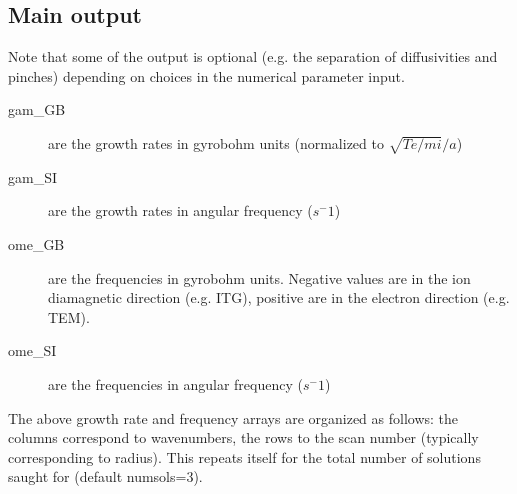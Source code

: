 \documentclass{article}
\begin{document}
\subsection{Main output}
Note that some of the output is optional (e.g. the separation of diffusivities and pinches) depending on choices in the numerical parameter input.
\begin{description} 
\item[gam\_GB] are the growth rates in gyrobohm units (normalized to $\sqrt{Te/mi}/a$)

\item[gam\_SI] are the growth rates in angular frequency ($s^-1$)

\item[ome\_GB] are the frequencies in gyrobohm units. Negative values are in the ion diamagnetic direction (e.g. ITG), positive are in the electron direction (e.g. TEM).

\item[ome\_SI] are the frequencies in angular frequency ($s^-1$)
\end{description} 

The above growth rate and frequency arrays are organized as follows: the columns correspond to wavenumbers, the rows to the scan number (typically corresponding to radius). 
This repeats itself for the total number of solutions saught for (default numsols=3).
\end{document}
